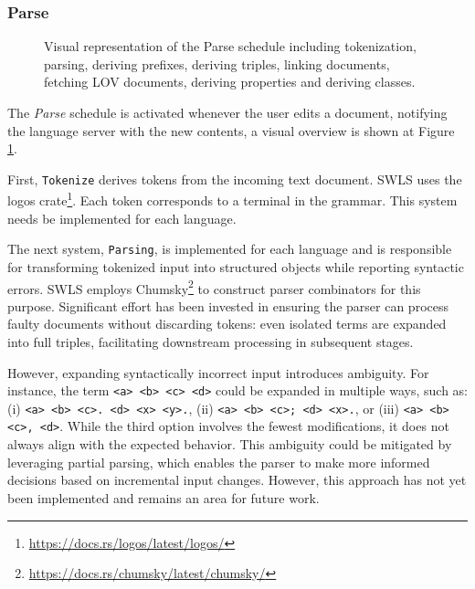 \subsubsection{Parse}

\begin{figure}[tb]
 \centering
  \caption{Visual representation of the Parse schedule including tokenization, parsing, deriving prefixes, deriving triples, linking documents, fetching LOV documents, deriving properties and deriving classes. }\label{fig:Parse}
\end{figure}

The \textit{Parse} schedule is activated whenever the user edits a document, notifying the language server with the new contents, a visual overview is shown at Figure \ref{fig:Parse}.

First, \texttt{Tokenize} derives tokens from the incoming text document. SWLS uses the logos crate\footnote{\url{https://docs.rs/logos/latest/logos/}}. 
Each token corresponds to a terminal in the grammar. This system needs be implemented for each language.

The next system, \texttt{Parsing}, is implemented for each language and is responsible for transforming tokenized input into structured objects while reporting syntactic errors. 
SWLS employs Chumsky\footnote{\url{https://docs.rs/chumsky/latest/chumsky/}} to construct parser combinators for this purpose.
Significant effort has been invested in ensuring the parser can process faulty documents without discarding tokens: even isolated terms are expanded into full triples, facilitating downstream processing in subsequent stages.

However, expanding syntactically incorrect input introduces ambiguity.
For instance, the term \texttt{<a> <b> <c> <d>} could be expanded in multiple ways, such as: (i) \texttt{<a> <b> <c>. <d> <x> <y>.}, (ii) \texttt{<a> <b> <c>; <d> <x>.}, or (iii) \texttt{<a> <b> <c>, <d>}.
While the third option involves the fewest modifications, it does not always align with the expected behavior.
This ambiguity could be mitigated by leveraging partial parsing, which enables the parser to make more informed decisions based on incremental input changes.
However, this approach has not yet been implemented and remains an area for future work.

